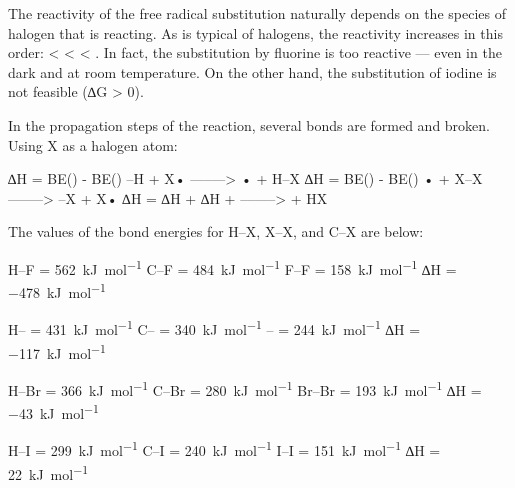 			The reactivity of the free radical substitution naturally depends on the species of halogen that is reacting.
			As is typical of halogens, the reactivity increases in this order:  <  <  < .
			In fact, the substitution by fluorine is too reactive –– even in the dark and at room temperature. On the other hand,
			the substitution of iodine is not feasible (∆G > 0).

			In the propagation steps of the reaction, several bonds are formed and broken. Using X as a halogen atom:

			\vspace{1em}
			\vbox{∆H = BE() - BE()		\tabto{60mm}–H + X•		\tabto{85mm} –––––> • + H–X	}
			\vbox{∆H = BE() - BE()		\tabto{60mm}• + X–X		\tabto{85mm} –––––> –X + X•	}
			\vbox{∆H = ∆H + ∆H	\tabto{60mm} + 	\tabto{85mm} –––––>  + HX	}

			The values of the bond energies for H–X, X–X, and C–X are below:
			\vspace{1.0em}

			\vbox{
						\tabto{25mm}	H–F			\tabto{50mm} = \SI{562}{\kilo\joule\per\mole}
							\tabto{25mm}	C–F			\tabto{50mm} = \SI{484}{\kilo\joule\per\mole}
							\tabto{25mm}	F–F			\tabto{50mm} = \SI{158}{\kilo\joule\per\mole}
							\tabto{25mm}	∆H	\tabto{50mm} = \SI{-478}{\kilo\joule\per\mole}
			}

			\vspace{1.0em}
			\vbox{
					\tabto{25mm}	H–\ch{\chlorine}				\tabto{50mm} = \SI{431}{\kilo\joule\per\mole}
								\tabto{25mm}	C–\ch{\chlorine}				\tabto{50mm} = \SI{340}{\kilo\joule\per\mole}
								\tabto{25mm}	\ch{\chlorine}–	\tabto{50mm} = \SI{244}{\kilo\joule\per\mole}
								\tabto{25mm}	∆H						\tabto{50mm} = \SI{-117}{\kilo\joule\per\mole}
			}

			\vspace{1.0em}
			\vbox{
					\tabto{25mm}	H–Br		\tabto{50mm} = \SI{366}{\kilo\joule\per\mole}
							\tabto{25mm}	C–Br		\tabto{50mm} = \SI{280}{\kilo\joule\per\mole}
							\tabto{25mm}	Br–Br		\tabto{50mm} = \SI{193}{\kilo\joule\per\mole}
							\tabto{25mm}	∆H	\tabto{50mm} = \SI{-43}{\kilo\joule\per\mole}
			}

			\vspace{1.0em}
			\vbox{
						\tabto{25mm}	H–I			\tabto{50mm} = \SI{299}{\kilo\joule\per\mole}
							\tabto{25mm}	C–I			\tabto{50mm} = \SI{240}{\kilo\joule\per\mole}
							\tabto{25mm}	I–I			\tabto{50mm} = \SI{151}{\kilo\joule\per\mole}
							\tabto{25mm}	∆H	\tabto{50mm} = \SI[retain-explicit-plus]{+22}{\kilo\joule\per\mole}
			}

